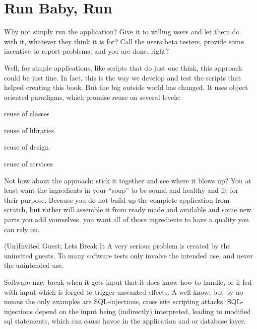\documentclass[\docroot/main]{subfiles}
\begin{document}
\chapter{Run Baby, Run}
\begin{wrapfigure}{r}{.45\textwidth}
\end{wrapfigure}
Why not simply run the application?
Give it to willing users and let them do with it, whatever they think it is for?
Call the users beta testers, provide some incentive to report problems, and you are done, right?

Well, for simple applications, like scripts that do just one think,
this approach could be just fine. In fact, this is the way we develop
and test the scripts that helped creating this book. But the big
outside world has changed. It uses object oriented paradigms, which
promise  reuse on several levels:
\begin{multicols}{2}
\begin{itemize*}
\item reuse of classes
\item reuse of libraries
\item reuse of design
\item reuse of services
\end{itemize*}
\end{multicols}
Not how about the approach: stick it together and see where it blows
up? You at least want the ingredients in your ``soup'' to be sound and
healthy and fit for their purpose. Because you do not build up the
complete application from scratch, but rather will assemble it from
ready made and available and some new parts you add yourselves, you
want all of those ingredients to have a quality you can rely on.

\begin{textbox}{(Un)Invited Guest; Lets Break It}%
  A very serious problem is created by the uninvited guests. To many
  software tests only involve the intended use, and never the
  unintended use. 

  Software may break when it gets input that it does know
  how to handle, or if fed with input which is forged to trigger
  unwanted effects. A well know, but by no means the only examples are
  SQL-injections, cross site scripting attacks. SQL-injections depend
  on the input being (indirectly) interpreted, leading to modified sql
  statements, which can cause havoc in the application and or database layer.
\end{textbox}
\end{document}
